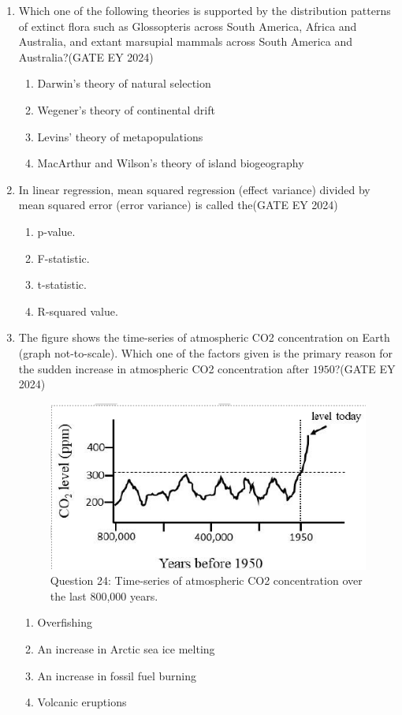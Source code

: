 \begin{enumerate}
\item Which one of the following theories is supported by the distribution patterns of extinct flora such as Glossopteris across South America, Africa and Australia, and extant marsupial mammals across South America and Australia?\hfill{(GATE EY 2024)}
    \begin{enumerate}
        \item Darwin's theory of natural selection
        \item Wegener's theory of continental drift
        \item Levins' theory of metapopulations
        \item MacArthur and Wilson's theory of island biogeography
    \end{enumerate}

\item In linear regression, mean squared regression (effect variance) divided by mean squared error (error variance) is called the\hfill{(GATE EY 2024)}
    \begin{multicols}{2}
    \begin{enumerate}
        \item p-value.
        \item F-statistic.
        \item t-statistic.
        \item R-squared value.
    \end{enumerate}
    \end{multicols}

\item The figure shows the time-series of atmospheric CO2 concentration on Earth (graph not-to-scale). Which one of the factors given is the primary reason for the sudden increase in atmospheric CO2 concentration after $1950$?\hfill{(GATE EY 2024)}
\begin{figure}[!ht]
    \centering
    \includegraphics[width=0.3\columnwidth]{figs/Q-24.png}
    \caption{Question 24: Time-series of atmospheric CO2 concentration over the last 800,000 years.}
    \label{Q.24}
\end{figure}
    \begin{enumerate}
        \item Overfishing
        \item An increase in Arctic sea ice melting
        \item An increase in fossil fuel burning
        \item Volcanic eruptions
    \end{enumerate}


\end{enumerate}
